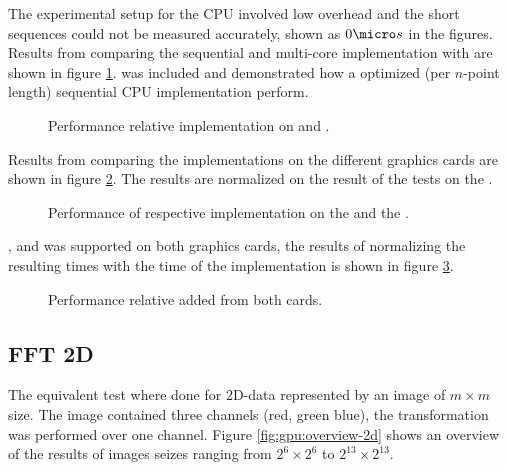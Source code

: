 The experimental setup for the CPU involved low overhead and the short sequences could not be measured accurately, shown as $0{\micro}s$ in the figures. Results from comparing the sequential {\CPP} and multi-core {\OMP} implementation with {\CU} are shown in figure \ref{fig:gtx:cpu}. {\FFTW} was included and demonstrated how a optimized (per $n$-point length) sequential CPU implementation perform.

\begin{figure}[!htbp]
	\centering
	
	\caption{Performance relative {\CU} implementation on {\NVCARD} and {\INTELCPU}.}
	\label{fig:gtx:cpu}
\end{figure}

Results from comparing the implementations on the different graphics cards are shown in figure \ref{fig:gpu-comparison}. The results are normalized on the result of the tests on the {\NVCARD}.

\begin{figure}[!htbp]
	\centering
	
	\caption{Performance of respective implementation on the {\AMDCARD} and the {\NVCARD}.}
	\label{fig:gpu-comparison}
\end{figure}

{\DX}, {\GL} and {\OCL} was supported on both graphics cards, the results of normalizing the resulting times with the time of the {\OCL} implementation is shown in figure \ref{fig:gpu-comparison-tech}.

\begin{figure}[!htbp]
	\centering
	
	\caption{Performance relative {\OCL} added from both cards.}
	\label{fig:gpu-comparison-tech}
\end{figure}


\newpage

\subsection{FFT 2D}

The equivalent test where done for 2D-data represented by an image of $m{\times}m$ size. The image contained three channels (red, green blue), the transformation was performed over one channel. Figure \ref{fig:gpu:overview-2d} shows an overview of the results of images seizes ranging from $2^{6}{\times}2^{6}$ to $2^{13}{\times}2^{13}$.

